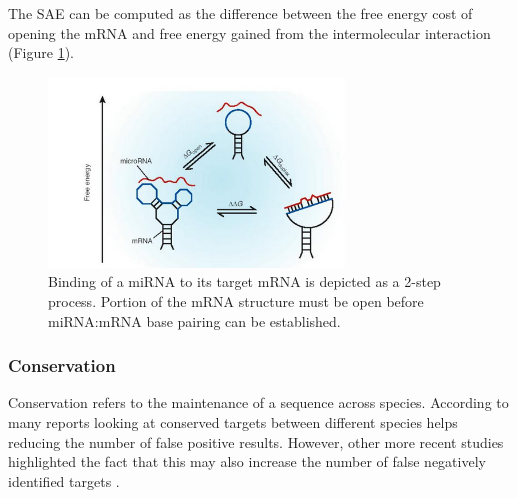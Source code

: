 The SAE	can be computed as the difference between the free energy cost of opening the mRNA and free energy gained from the intermolecular interaction (Figure \ref{fig:opening_energy}).

\begin{figure}[hbt!]
	\centering
	\includegraphics[width=0.7\textwidth]{Figures/opening_energy}
	\caption{Binding of a miRNA to its target mRNA is depicted as a 2-step process. Portion of the mRNA structure must be open before miRNA:mRNA base pairing can be established.}
	\label{fig:opening_energy}
\end{figure}

\subsubsection{Conservation}
Conservation refers to the maintenance of a sequence across species. According to many reports \cite{computational_methods} looking at conserved targets between different species helps reducing the number of false positive results. However, other more recent studies highlighted the fact that this may also increase the number of false negatively identified targets \cite{conserved_pairing}.